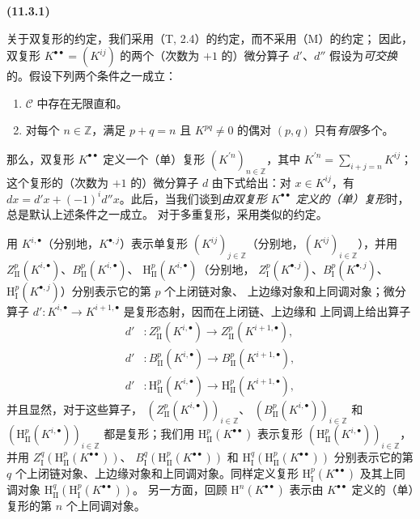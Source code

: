 \documentclass[UTF8,fontset=none,11pt,oneside,openany]{ctexbook}
\newenvironment{env}[1][]{%
  \par\medskip\noindent\textbf{(#1)}\ %
}{\par}
\let\EGAOriginalLabel\label
\renewcommand{\label}[1]{\phantomsection\EGAOriginalLabel{#1}}
\begin{document}
\begin{env}[11.3.1]
\label{0.11.3.1-fr}
关于双复形的约定，我们采用（T, 2.4）的约定，而不采用（M）的约定；
因此，双复形 $K^{\bullet\bullet}=(K^{ij})$ 的两个（次数为 $+1$ 的）微分算子
$d'$、$d''$ 假设为\emph{可交换}的。假设下列两个条件之一成立：
\begin{enumerate}
  \item[$1^\circ$] $\mathcal C$ 中存在无限直和。
  \item[$2^\circ$] 对每个 $n\in\mathbb Z$，满足 $p+q=n$ 且 $K^{pq}\ne0$
    的偶对 $(p,q)$ 只有\emph{有限}多个。
\end{enumerate}
那么，双复形 $K^{\bullet\bullet}$ 定义一个（单）复形
$(K^{\prime n})_{n\in\mathbb Z}$，其中
$K^{\prime n}=\sum_{i+j=n}K^{ij}$；这个复形的（次数为 $+1$ 的）微分算子 $d$
由下式给出：对 $x\in K^{ij}$，有
$dx=d'x+(-1)^i d''x$。此后，当我们谈到\emph{由双复形
$K^{\bullet\bullet}$ 定义的（单）复形}时，总是默认上述条件之一成立。
对于多重复形，采用类似的约定。

用 $K^{i,\bullet}$（分别地，$K^{\bullet,j}$）表示单复形
$(K^{ij})_{j\in\mathbb Z}$（分别地，$(K^{ij})_{i\in\mathbb Z}$），并用
$Z_{\mathrm{II}}^p(K^{i,\bullet})$、$B_{\mathrm{II}}^p(K^{i,\bullet})$、
$\mathrm H_{\mathrm{II}}^p(K^{i,\bullet})$（分别地，
$Z_{\mathrm I}^p(K^{\bullet,j})$、$B_{\mathrm I}^p(K^{\bullet,j})$、
$\mathrm H_{\mathrm I}^p(K^{\bullet,j})$）分别表示它的第 $p$ 个上闭链对象、
上边缘对象和上同调对象；微分算子
$d':K^{i,\bullet}\to K^{i+1,\bullet}$ 是复形态射，因而在上闭链、上边缘和
上同调上给出算子
\[
\begin{aligned}
  d'&:Z_{\mathrm{II}}^p(K^{i,\bullet})
      \longrightarrow Z_{\mathrm{II}}^p(K^{i+1,\bullet}),\\
  d'&:B_{\mathrm{II}}^p(K^{i,\bullet})
      \longrightarrow B_{\mathrm{II}}^p(K^{i+1,\bullet}),\\
  d'&:\mathrm H_{\mathrm{II}}^p(K^{i,\bullet})
      \longrightarrow \mathrm H_{\mathrm{II}}^p(K^{i+1,\bullet}),
\end{aligned}
\]
并且显然，对于这些算子，
$(Z_{\mathrm{II}}^p(K^{i,\bullet}))_{i\in\mathbb Z}$、
$(B_{\mathrm{II}}^p(K^{i,\bullet}))_{i\in\mathbb Z}$ 和
$(\mathrm H_{\mathrm{II}}^p(K^{i,\bullet}))_{i\in\mathbb Z}$ 都是复形；我们用
$\mathrm H_{\mathrm{II}}^p(K^{\bullet\bullet})$ 表示复形
$(\mathrm H_{\mathrm{II}}^p(K^{i,\bullet}))_{i\in\mathbb Z}$，并用
$Z_{\mathrm I}^q(\mathrm H_{\mathrm{II}}^p(K^{\bullet\bullet}))$、
$B_{\mathrm I}^q(\mathrm H_{\mathrm{II}}^p(K^{\bullet\bullet}))$ 和
$\mathrm H_{\mathrm I}^q(\mathrm H_{\mathrm{II}}^p(K^{\bullet\bullet}))$
分别表示它的第 $q$ 个上闭链对象、上边缘对象和上同调对象。同样定义复形
$\mathrm H_{\mathrm I}^p(K^{\bullet\bullet})$ 及其上同调对象
$\mathrm H_{\mathrm{II}}^q(\mathrm H_{\mathrm I}^p(K^{\bullet\bullet}))$。
另一方面，回顾 $\mathrm H^n(K^{\bullet\bullet})$ 表示由
$K^{\bullet\bullet}$ 定义的（单）复形的第 $n$ 个上同调对象。
\end{env}
\end{document}
